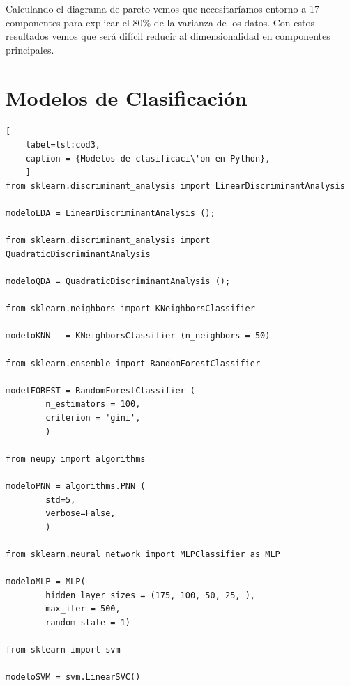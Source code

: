 \documentclass{article}
\begin{document}
Calculando el diagrama de pareto vemos que necesitaríamos entorno a 17
componentes para explicar el 80\% de la varianza de los datos. Con
estos resultados vemos que  será difícil reducir al dimensionalidad
en componentes principales.

\newpage
\section{Modelos de Clasificación}

\begin{lstlisting}[
	label=lst:cod3,
	caption = {Modelos de clasificaci\'on en Python},
	]
from sklearn.discriminant_analysis import LinearDiscriminantAnalysis

modeloLDA = LinearDiscriminantAnalysis ();

from sklearn.discriminant_analysis import QuadraticDiscriminantAnalysis

modeloQDA = QuadraticDiscriminantAnalysis ();

from sklearn.neighbors import KNeighborsClassifier

modeloKNN   = KNeighborsClassifier (n_neighbors = 50)

from sklearn.ensemble import RandomForestClassifier

modelFOREST = RandomForestClassifier (
        n_estimators = 100,
        criterion = 'gini',
        )

from neupy import algorithms

modeloPNN = algorithms.PNN (
        std=5,
        verbose=False,
        )

from sklearn.neural_network import MLPClassifier as MLP

modeloMLP = MLP(
        hidden_layer_sizes = (175, 100, 50, 25, ),
        max_iter = 500,
        random_state = 1)

from sklearn import svm

modeloSVM = svm.LinearSVC()
\end{lstlisting}
\end{document}
